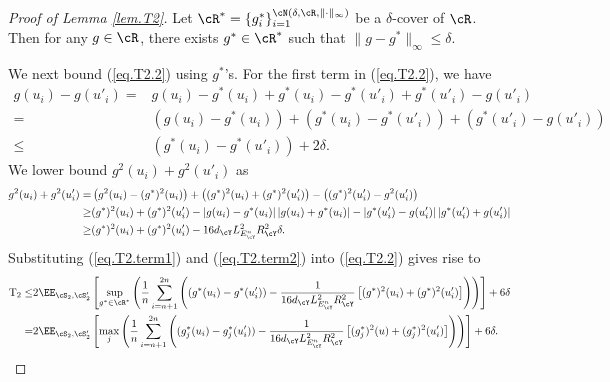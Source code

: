 \documentclass[11pt]{article} %
\begin{document}
\begin{proof}[Proof of Lemma \ref{lem.T2}]
	Let $\cR^*=\{g_i^*\}_{i=1}^{\cN(\delta,\cR,\|\cdot\|_{\infty})}$ be a $\delta$-cover of $\cR$. Then for any $g\in \cR$, there exists $g^*\in \cR^*$ such that $\|g-g^*\|_{\infty}\leq \delta$.
	
	We next bound (\ref{eq.T2.2}) using $g^*$'s. For the first term in (\ref{eq.T2.2}), we have
	\begin{align}
		g(u_i)-g(u'_i)=& g(u_i)-g^*(u_i)+g^*(u_i)-g^*(u'_i)+g^*(u'_i)-g(u'_i) \nonumber\\
		=&\left(g(u_i)-g^*(u_i)\right) +\left(g^*(u_i)-g^*(u'_i)\right)+\left(g^*(u'_i)-g(u'_i)\right)\nonumber\\
		\leq &\left(g^*(u_i)-g^*(u'_i)\right)+2\delta.
		\label{eq.T2.term1}
	\end{align}
	We lower bound $g^2(u_i)+g^2(u'_i)$ as
	\begin{align}
		g^2(u_i)+g^2(u'_i)=&\left(g^2(u_i)-(g^*)^2(u_i)\right)+\left((g^*)^2(u_i)+(g^*)^2(u'_i)\right)-\left((g^*)^2(u'_i)- g^2(u'_i)\right) \nonumber\\
		\geq& (g^*)^2(u_i)+(g^*)^2(u'_i) -\left|g(u_i)-g^*(u_i)\right|\left|g(u_i)+g^*(u_i)\right| -\left|g^*(u'_i)- g(u'_i)\right|\left|g^*(u'_i)+ g(u'_i)\right| \nonumber\\
		\geq &(g^*)^2(u_i)+(g^*)^2(u'_i)-16d_{\cY}L_{E^n_{\cY}}^2R_{\cY}^2\delta.
		\label{eq.T2.term2}
	\end{align}
	Substituting (\ref{eq.T2.term1}) and (\ref{eq.T2.term2}) into (\ref{eq.T2.2}) gives rise to
	\begin{align}
		{\rm T_2}\leq&2\EE_{\cS_2,\cS'_2}\left[\sup_{g^*\in \cR^*}\left(\frac{1}{n}\sum_{i=n+1}^{2n}\left( (g^*(u_i)-g^*(u'_i))-\frac{1}{16d_{\cY}L_{E^n_{\cY}}^2R_{\cY}^2}\left[(g^*)^2(u_i)+(g^*)^2(u'_i)\right]\right)\right)\right] + 6\delta \nonumber\\
		=&2\EE_{\cS_2,\cS'_2}\left[\max_j\left(\frac{1}{n}\sum_{i=n+1}^{2n}\left( (g_j^*(u_i)-g_j^*(u'_i))-\frac{1}{16d_{\cY}L_{E^n_{\cY}}^2R_{\cY}^2}\left[(g_j^*)^2(u)+(g_j^*)^2(u'_i)\right]\right)\right)\right] + 6\delta.
	\end{align}
	

\end{proof}
\end{document}
